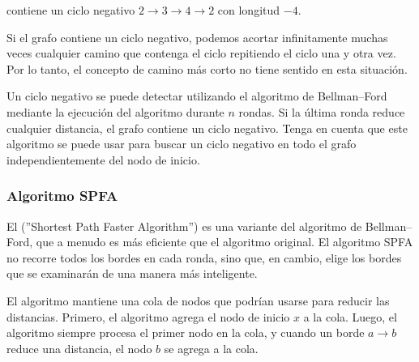 \begin{center}
\end{center}
\noindent
contiene un ciclo negativo
$2 \rightarrow 3 \rightarrow 4 \rightarrow 2$
con longitud $-4$.



Si el grafo contiene un ciclo negativo,
podemos acortar infinitamente muchas veces
cualquier camino que contenga el ciclo repitiendo el ciclo
una y otra vez.
Por lo tanto, el concepto de camino más corto
no tiene sentido en esta situación.

Un ciclo negativo se puede detectar
utilizando el algoritmo de Bellman–Ford mediante
la ejecución del algoritmo durante $n$ rondas.
Si la última ronda reduce cualquier distancia,
el grafo contiene un ciclo negativo.
Tenga en cuenta que este algoritmo se puede usar para
buscar
un ciclo negativo en todo el grafo
independientemente del nodo de inicio.

\subsubsection{Algoritmo SPFA}


El  (''Shortest Path Faster Algorithm'') \cite{fan94}
es una variante del algoritmo de Bellman–Ford,
que a menudo es más eficiente que el algoritmo original.
El algoritmo SPFA no recorre todos los bordes en cada ronda,
sino que, en cambio, elige los bordes que se examinarán
de una manera más inteligente.

El algoritmo mantiene una cola de nodos que podrían
usarse para reducir las distancias.
Primero, el algoritmo agrega el nodo de inicio $x$
a la cola.
Luego, el algoritmo siempre procesa el
primer nodo en la cola, y cuando un borde
$a \rightarrow b$ reduce una distancia,
el nodo $b$ se agrega a la cola.
% 
% 

